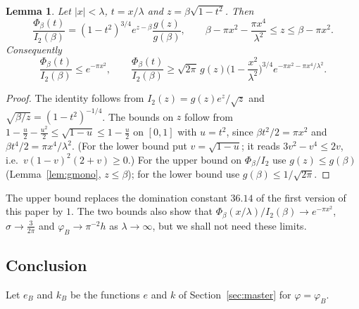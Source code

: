 \documentclass[11pt]{amsart}
\newtheorem{lemma}[proposition]{Lemma}
\theoremstyle{definition}
\theoremstyle{remark}
\numberwithin{equation}{section}
\begin{document}
\begin{lemma}\label{lem:B5}
Let $|x|<\lambda$, $t=x/\lambda$ and $z=\beta\sqrt{1-t^2}$. Then
\[
\frac{\Phi_\beta(t)}{I_2(\beta)}=(1-t^2)^{3/4}e^{z-\beta}\frac{g(z)}{g(\beta)},\qquad \beta-\pi x^2-\frac{\pi x^4}{\lambda^2}\le z\le\beta-\pi x^2 .
\]
Consequently
\[
\frac{\Phi_\beta(t)}{I_2(\beta)}\le e^{-\pi x^2},\qquad \frac{\Phi_\beta(t)}{I_2(\beta)}\ge\sqrt{2\pi}\,g(z)\Big(1-\frac{x^2}{\lambda^2}\Big)^{3/4}e^{-\pi x^2-\pi x^4/\lambda^2}.
\]
\end{lemma}
\begin{proof}
The identity follows from $I_2(z)=g(z)e^z/\sqrt z$ and $\sqrt{\beta/z}=(1-t^2)^{-1/4}$. The bounds on $z$ follow from $1-\frac u2-\frac{u^2}2\le\sqrt{1-u}\le1-\frac u2$ on $[0,1]$ with $u=t^2$, since $\beta t^2/2=\pi x^2$ and $\beta t^4/2=\pi x^4/\lambda^2$. (For the lower bound put $v=\sqrt{1-u}$; it reads $3v^2-v^4\le2v$, i.e.\ $v(1-v)^2(2+v)\ge0$.) For the upper bound on $\Phi_\beta/I_2$ use $g(z)\le g(\beta)$ (Lemma~\ref{lem:gmono}, $z\le\beta$); for the lower bound use $g(\beta)\le1/\sqrt{2\pi}$.
\end{proof}
The upper bound replaces the domination constant $36.14$ of the first version of this paper by $1$. The two bounds also show that $\Phi_\beta(x/\lambda)/I_2(\beta)\to e^{-\pi x^2}$, $\sigma\to\frac3{2\pi}$ and $\varphi_B\to\pi^{-2}h$ as $\lambda\to\infty$, but we shall not need these limits.

\subsection{Conclusion}
Let $e_B$ and $k_B$ be the functions $e$ and $k$ of Section~\ref{sec:master} for $\varphi=\varphi_B$.
\end{document}

